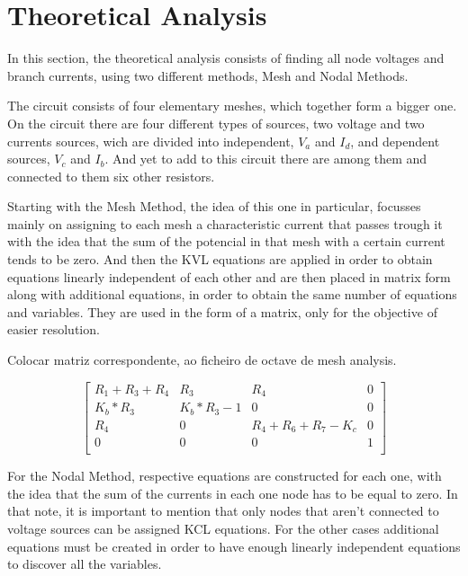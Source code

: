 \section{Theoretical Analysis}
\label{sec:analysis}

In this section, the theoretical analysis consists of finding all node voltages and branch currents, using two different methods, Mesh and Nodal Methods.  

The circuit consists of four elementary meshes, which together form a bigger one. On the circuit there are four different types of sources, two voltage and two currents sources, wich are divided into independent, $V_a$ and $I_d$, and dependent sources, $V_c$ and $I_b$. And yet to add to this circuit there are among them and connected to them six other resistors.

\vspace {1cm}
Starting with the Mesh Method, the idea of this one in particular, focusses mainly on assigning to each mesh a characteristic current that passes trough it with the idea that the sum of the potencial in that mesh with a certain current tends to be zero. And then the KVL equations are applied in order to obtain equations linearly independent of each other and are then placed in matrix form along with additional equations, in order to obtain the same number of equations and variables. They are used in the form of a matrix, only for the objective of easier resolution.  

\vspace {1cm}
Colocar matriz correspondente, ao ficheiro de octave de mesh analysis. 
\vspace{1cm}

$$
\begin{bmatrix} 
R_1+R_3+R_4 & R_3       & R_4             & 0 \\       
K_b*R_3     & K_b*R_3-1 & 0               & 0 \\
R_4         &     0     & R_4+R_6+R_7-K_c & 0 \\
0           & 0         & 0               & 1 \\
\end {bmatrix} 
$$
\quad


For the Nodal Method, respective equations are constructed for each one, with the idea that the sum of the currents in each one node has to be equal to zero. In that note, it is important to mention that only nodes that aren't connected to voltage sources can be assigned KCL equations. For the other cases additional equations must be created in order to have enough linearly independent equations to discover all the variables. 

